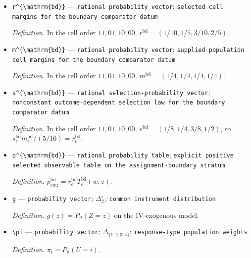 \documentclass{article}
\begin{document}
\begin{itemize}
  \par\smallskip\noindent\emph{Definition.} \(T^{\mathrm{bd}}_e=b^{\mathrm{bd}}_i(a^{\mathrm{bd}}_{ei})^{\top}+b^{\mathrm{bd}}_j(a^{\mathrm{bd}}_{ej})^{\top}\) whenever \(\mathcal I_e=\{i,j\}\).
  \item \texttt{r\textasciicircum{}\{\textbackslash{}\allowbreak{}mathrm\{bd\}\allowbreak{}\}\allowbreak{}} --- \texttt{rational probability vector}; \texttt{selected cell margins for the boundary comparator datum}
  \par\smallskip\noindent\emph{Definition.} In the cell order \(11,01,10,00\), \(r^{\mathrm{bd}}=(1/10,1/5,3/10,2/5)\).
  \item \texttt{m\textasciicircum{}\{\textbackslash{}\allowbreak{}mathrm\{bd\}\allowbreak{}\}\allowbreak{}} --- \texttt{rational probability vector}; \texttt{supplied population cell margins for the boundary comparator datum}
  \par\smallskip\noindent\emph{Definition.} In the cell order \(11,01,10,00\), \(m^{\mathrm{bd}}=(1/4,1/4,1/4,1/4)\).
  \item \texttt{s\textasciicircum{}\{\textbackslash{}\allowbreak{}mathrm\{bd\}\allowbreak{}\}\allowbreak{}} --- \texttt{rational selection-\allowbreak{}probability vector}; \texttt{nonconstant outcome-\allowbreak{}dependent selection law for the boundary comparator datum}
  \par\smallskip\noindent\emph{Definition.} In the cell order \(11,01,10,00\), \(s^{\mathrm{bd}}=(1/8,1/4,3/8,1/2)\), so \(s^{\mathrm{bd}}_em^{\mathrm{bd}}_e/(5/16)=r^{\mathrm{bd}}_e\).
  \item \texttt{p\textasciicircum{}\{\textbackslash{}\allowbreak{}mathrm\{bd\}\allowbreak{}\}\allowbreak{}} --- \texttt{rational probability table}; \texttt{explicit positive selected observable table on the assignment-\allowbreak{}boundary stratum}
  \par\smallskip\noindent\emph{Definition.} \(p^{\mathrm{bd}}_{ewz}=r^{\mathrm{bd}}_eT^{\mathrm{bd}}_e(w,z)\).
  \item \texttt{g} --- \texttt{probability vector}; \(\Delta_{\mathcal Z}^{\circ}\); \texttt{common instrument distribution}
  \par\smallskip\noindent\emph{Definition.} \(g(z)=P_{\vartheta}(Z=z)\) on the IV-exogenous model.
  \item \texttt{\textbackslash{}\allowbreak{}pi} --- \texttt{probability vector}; \(\Delta_{\{1,2,3,4\}}\); \texttt{response-\allowbreak{}type population weights}
  \par\smallskip\noindent\emph{Definition.} \(\pi_i=P_{\vartheta}(U=i)\).

\end{itemize}
\end{document}
